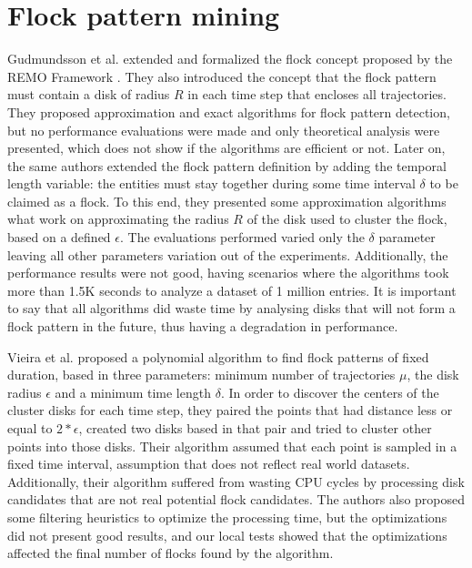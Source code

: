\section{Flock pattern mining}
\label{sec:rel_flocks}
Gudmundsson et al. \citep{gudefficient} \citep{gudlongest} extended and formalized the flock concept proposed by the
REMO Framework \citep{remo}. They also introduced the concept that the flock pattern must contain a disk of radius $R$
in each time step that encloses all trajectories. They proposed approximation and exact algorithms for flock pattern
detection, but no performance evaluations were made and only theoretical analysis were presented, which does not show if
the algorithms are efficient or not. Later on, the same authors \citep{gudlongest} extended the flock pattern definition
by adding the temporal length variable: the entities must stay together during some time interval $\delta$ to be claimed
as a flock. To this end, they presented some approximation algorithms what work on approximating the radius $R$ of the
disk used to cluster the flock, based on a defined $\epsilon$. The evaluations performed \citep{gudlongest} varied only
the $\delta$ parameter leaving all other parameters variation out of the experiments. Additionally, the performance
results were not good, having scenarios where the algorithms took more than 1.5K seconds to analyze a dataset of 1
million entries. It is important to say that all algorithms did waste time by analysing disks that will not form a flock
pattern in the future, thus having a degradation in performance.

Vieira et al. \citep{vieira} proposed a polynomial algorithm to find flock patterns of fixed duration, based in three
parameters: minimum number of trajectories $\mu$, the disk radius $\epsilon$ and a minimum time length $\delta$.  In
order to discover the centers of the cluster disks for each time step, they paired the points that had distance less or
equal to $2*\epsilon$, created two disks based in that pair and tried to cluster other points into those disks. Their
algorithm assumed that each point is sampled in a fixed time interval, assumption that does not reflect real world
datasets. Additionally, their algorithm suffered from wasting CPU cycles by processing disk candidates that are not real
potential flock candidates. The authors also proposed some filtering heuristics to optimize the processing time, but the
optimizations did not present good results, and our local tests showed that the optimizations affected the final number
of flocks found by the algorithm.

